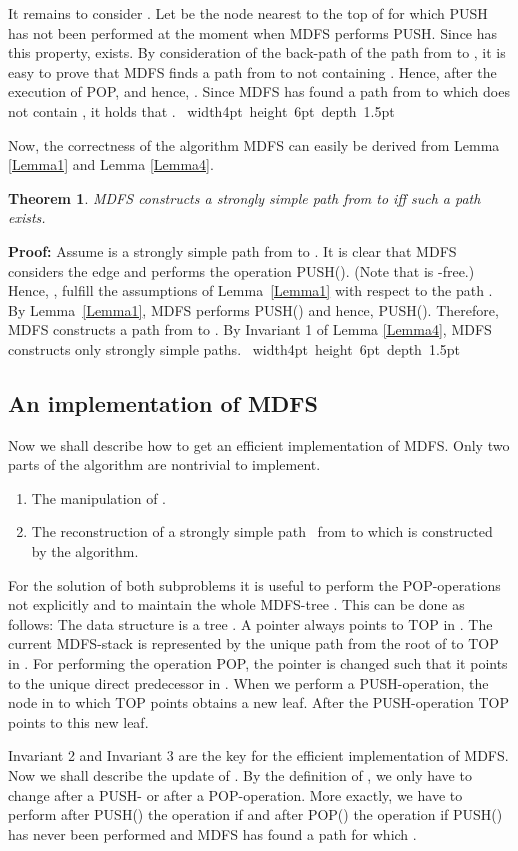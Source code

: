 \documentclass[12pt,twoside,a4paper]{article}
\def\QED{\hbox{\hskip 1pt \vrule width4pt height 6pt depth 1.5pt \hskip 1pt}}
\newtheorem{theo}{Theorem}
\begin{document}
It remains to consider . Let  be the node 
nearest to the top of  for which PUSH has not been performed at 
the moment when MDFS performs PUSH. Since  has this property,
 exists.
By consideration of the back-path of the path from  to , 
it is easy to prove that MDFS finds a path from  to 
not containing . Hence,  after the 
execution of POP, and hence, 
. Since MDFS has found a path from  to  which 
does not contain , it holds that .  
\QED

\medskip
Now, the correctness of the algorithm MDFS can easily be derived from Lemma \ref{Lemma1}
and Lemma \ref{Lemma4}.
\begin{theo}
MDFS constructs a strongly simple path from  to  iff such a path exists.
\end{theo}
{\bf Proof:}
Assume  is a strongly simple path 
from  to . It is clear that MDFS considers the
edge  and performs the operation PUSH(). (Note that 
 is -free.)
Hence, ,  fulfill the assumptions of Lemma~\ref{Lemma1}
with respect to the path .
By Lemma~\ref{Lemma1}, MDFS performs PUSH() and hence, 
PUSH(). Therefore, MDFS constructs a path from  to .
By Invariant 1 of Lemma \ref{Lemma4}, MDFS constructs only strongly simple paths.
\QED

\subsection{An implementation of MDFS} \label{MDFSim}

Now we shall describe how to get an efficient implementation of MDFS. Only 
two parts of the algorithm are nontrivial to implement.
\begin{enumerate}
\item The manipulation of .
\item The reconstruction of a strongly simple path~ from  to  which
 is constructed by the algorithm.
\end{enumerate}
For the solution of both subproblems it is useful to perform the
POP-operations not explicitly and to maintain the whole MDFS-tree .
This can be done as follows:
The data structure is a tree . A pointer  always points to TOP 
in . The current MDFS-stack  is represented by the unique path from the 
root  of  to TOP in . For performing the operation POP, the
pointer  is changed such that it points to the unique direct predecessor 
in . When we perform a PUSH-operation, the node in  to which TOP 
points obtains a new leaf. After the PUSH-operation TOP points to this
new leaf.

Invariant 2 and Invariant 3 are the key for the efficient implementation of 
MDFS. Now we shall describe the update of . By the definition of
, we only have to change  after a PUSH- or after
a POP-operation. More exactly, we have to perform after PUSH() the 
operation  if  and after POP()
the operation  if PUSH() has never been performed and 
MDFS has found a path  for which .
\end{document}
